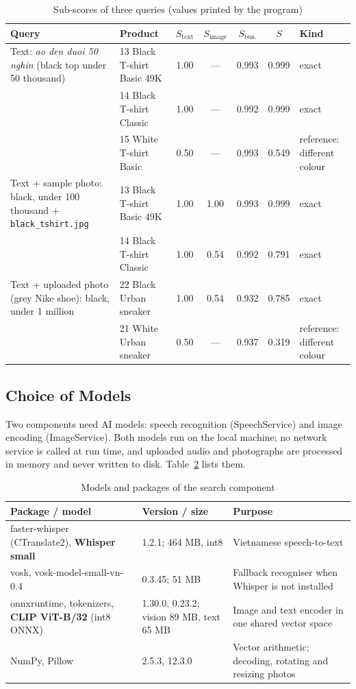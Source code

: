 \begin{table}[H]
\centering
\small
\caption{Sub-scores of three queries (values printed by the program)}
\label{tab:searchexample}
\begin{tabular}{@{}p{4.1cm} p{3.5cm} cccc p{1.9cm}@{}}
\toprule
\textbf{Query} & \textbf{Product} & $S_\text{text}$ & $S_\text{image}$ & $S_\text{bus.}$ & $S$ & \textbf{Kind} \\ \midrule
Text: \emph{ao den duoi 50 nghin} (black top under 50 thousand) & 13 Black T-shirt Basic 49K & 1.00 & --- & 0.993 & 0.999 & exact \\
 & 14 Black T-shirt Classic & 1.00 & --- & 0.992 & 0.999 & exact \\
 & 15 White T-shirt Basic & 0.50 & --- & 0.993 & 0.549 & reference: different colour \\ \midrule
Text + sample photo: black, under 100 thousand + \texttt{black\_tshirt.jpg} & 13 Black T-shirt Basic 49K & 1.00 & 1.00 & 0.993 & 0.999 & exact \\
 & 14 Black T-shirt Classic & 1.00 & 0.54 & 0.992 & 0.791 & exact \\ \midrule
Text + uploaded photo (grey Nike shoe): black, under 1 million & 22 Black Urban sneaker & 1.00 & 0.54 & 0.932 & 0.785 & exact \\
 & 21 White Urban sneaker & 0.50 & --- & 0.937 & 0.319 & reference: different colour \\ \bottomrule
\end{tabular}
\end{table}

\subsection{Choice of Models}
\label{subsec:searchmodels}
Two components need AI models: speech recognition (SpeechService) and image encoding (ImageService). Both models run on the local machine; no network service is called at run time, and uploaded audio and photographs are processed in memory and never written to disk. Table~\ref{tab:searchpkgs} lists them.

\begin{table}[H]
\centering
\small
\caption{Models and packages of the search component}
\label{tab:searchpkgs}
\begin{tabular}{@{}p{5.2cm} p{3.0cm} p{5.6cm}@{}}
\toprule
\textbf{Package / model} & \textbf{Version / size} & \textbf{Purpose} \\ \midrule
faster-whisper (CTranslate2), \textbf{Whisper small} & 1.2.1; 464 MB, int8 & Vietnamese speech-to-text \\
vosk, vosk-model-small-vn-0.4 & 0.3.45; 51 MB & Fallback recogniser when Whisper is not installed \\
onnxruntime, tokenizers, \textbf{CLIP ViT-B/32} (int8 ONNX) & 1.30.0, 0.23.2; vision 89 MB, text 65 MB & Image and text encoder in one shared vector space \\
NumPy, Pillow & 2.5.3, 12.3.0 & Vector arithmetic; decoding, rotating and resizing photos \\ \bottomrule
\end{tabular}
\end{table}

